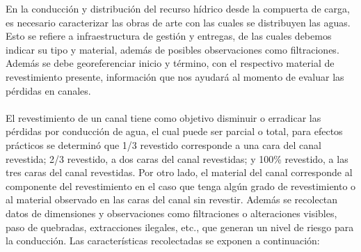 \documentclass[]{article}
\begin{document}
En la conducción y distribución del recurso hídrico desde la compuerta de carga, es necesario caracterizar las obras de arte con las cuales se distribuyen las aguas. Esto se refiere a infraestructura de gestión y entregas, de las cuales debemos indicar su tipo y material, además de posibles observaciones como filtraciones. Además se debe georeferenciar inicio y término, con el respectivo material de revestimiento presente, información que nos ayudará al momento de evaluar las pérdidas en canales.\\
\\
El revestimiento de un canal tiene como objetivo disminuir o erradicar las pérdidas por conducción de agua, el cual puede ser parcial o total, para efectos prácticos se determinó que 1/3 revestido corresponde a una cara del canal revestida; 2/3 revestido, a dos caras del canal revestidas; y 100\% revestido, a las tres caras del canal revestidas. Por otro lado, el material del canal corresponde al componente del revestimiento en el caso que tenga algún grado de revestimiento o al material observado en las caras del canal sin revestir. Además se recolectan datos de dimensiones y observaciones como filtraciones o alteraciones visibles, paso de quebradas, extracciones ilegales, etc., que generan un nivel de riesgo para la conducción. Las características recolectadas se exponen a continuación:\\
\\
\clearpage
\end{document}
